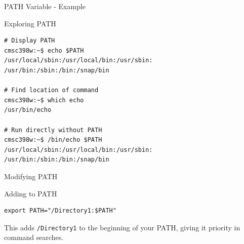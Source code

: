 \documentclass[presentation,aspectratio=1610]{beamer}
\begin{document}
\begin{frame}[label={sec:orgb43950d},fragile]{PATH Variable - Example}
 \begin{block}{Exploring PATH}
\begin{verbatim}
# Display PATH
cmsc398w:~$ echo $PATH
/usr/local/sbin:/usr/local/bin:/usr/sbin:
/usr/bin:/sbin:/bin:/snap/bin

# Find location of command
cmsc398w:~$ which echo
/usr/bin/echo

# Run directly without PATH
cmsc398w:~$ /bin/echo $PATH
/usr/local/sbin:/usr/local/bin:/usr/sbin:
/usr/bin:/sbin:/bin:/snap/bin
\end{verbatim}
\end{block}
\end{frame}
\begin{frame}[label={sec:org1f7491d},fragile]{Modifying PATH}
 \begin{exampleblock}{Adding to PATH}\label{sec:org27b42af}
\begin{verbatim}
export PATH="/Directory1:$PATH"
\end{verbatim}

This adds \texttt{/Directory1} to the beginning of your PATH, giving it priority in command searches.
\end{exampleblock}
\end{frame}
\end{document}
